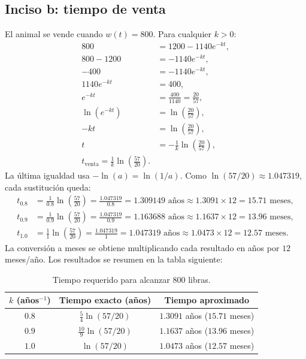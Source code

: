 \subsection{Inciso b: tiempo de venta}
El animal se vende cuando $w(t)=800$. Para cualquier $k>0$:
\begin{align*}
 800&=1200-1140e^{-kt},\\
 800-1200&=-1140e^{-kt},\\
 -400&=-1140e^{-kt},\\
 1140e^{-kt}&=400,\\
 e^{-kt}&=\frac{400}{1140}=\frac{20}{57},\\
 \ln\left(e^{-kt}\right)&=\ln\left(\frac{20}{57}\right),\\
 -kt&=\ln\left(\frac{20}{57}\right),\\
 t&=-\frac{1}{k}\ln\left(\frac{20}{57}\right),\\
 \boxed{t_{\mathrm{venta}}=\frac{1}{k}\ln\left(\frac{57}{20}\right)}.
\end{align*}
La última igualdad usa $-\ln(a)=\ln(1/a)$. Como $\ln(57/20)\approx1.047319$, cada sustitución queda:
\begin{align*}
 t_{0.8}&=\frac{1}{0.8}\ln\left(\frac{57}{20}\right)
          =\frac{1.047319}{0.8}=1.309149\text{ años}
		  \approx 1.3091\times12=15.71\text{ meses},\\
 t_{0.9}&=\frac{1}{0.9}\ln\left(\frac{57}{20}\right)
          =\frac{1.047319}{0.9}=1.163688\text{ años}
		  \approx 1.1637\times12=13.96\text{ meses},\\
 t_{1.0}&=\frac{1}{1}\ln\left(\frac{57}{20}\right)
          =\frac{1.047319}{1}=1.047319\text{ años}
		  \approx 1.0473\times12=12.57\text{ meses}.
\end{align*}
La conversión a meses se obtiene multiplicando cada resultado en años por $12$ meses/año.
Los resultados se resumen en la tabla siguiente:

\begin{table}[H]
\centering
\caption{Tiempo requerido para alcanzar 800 libras.}
\label{tab:tiempos-venta}
\renewcommand{\arraystretch}{1.65}
\begin{tabular}{ccc}
\toprule
$k$ (años$^{-1}$) & Tiempo exacto (años) & Tiempo aproximado \\
\midrule
$0.8$ & $\frac{5}{4}\ln(57/20)$ & $1.3091$ años ($15.71$ meses) \\
$0.9$ & $\frac{10}{9}\ln(57/20)$ & $1.1637$ años ($13.96$ meses) \\
$1.0$ & $\ln(57/20)$ & $1.0473$ años ($12.57$ meses) \\
\bottomrule
\end{tabular}
\end{table}

